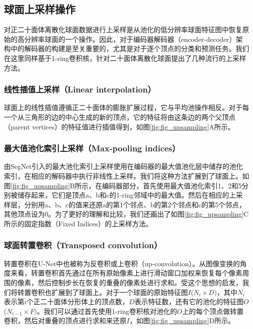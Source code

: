 \subsection{球面上采样操作}
对正二十面体离散化球面数据进行上采样是从池化的低分辨率球面特征图中恢复原始的高分辨率球面的一个操作。因此，对于编码器解码器（encoder-decoder）架构\cite{badrinarayanan2017segnet}中的解码器的构建是至关重要的，尤其是对于逐个顶点的分类和预测任务。我们在这里同样基于1-ring卷积核，针对二十面体离散化球面提出了几种流行的上采样方法。

\subsubsection{线性插值上采样（Linear interpolation）}
球面上的线性插值遵循正二十面体的膨胀扩展过程，它与平均池操作相反。对于每一个从三角形的边的中心生成的新的顶点，它的特征将由这条边的两个父顶点（parent vertices）的特征值进行插值得到，如图\ref{fig:fig_upsampling}A所示。

\subsubsection{最大值池化索引上采样（Max-pooling indices）}
由SegNet\cite{badrinarayanan2017segnet}引入的最大池化索引上采样使用在编码器的最大值池化层中储存的池化索引，在相应的解码器中执行非线性上采样。我们将这种方法扩展到了球面上。如图\ref{fig:fig_upsampling}B所示，在编码器部分，首先使用最大值池化索引1、2和5分别被储存起来，它们是顶点a、b和c的1-ring邻域中的最大值。然后在相应的上采样层，分别用a、b、c的值来还原a的第1个邻点、b的第2个邻点和c的第5个邻点，其他顶点设为0。为了更好的理解和比较，我们还画出了如图\ref{fig:fig_upsampling}C所示的固定指数（Fixed Indices）的上采样方法。

\subsubsection{球面转置卷积（Transposed convolution）}
转置卷积在U-Net中也被称为反卷积或上卷积（up-convolution）\cite{ronneberger2015u}。从图像变换的角度来看，转置卷积首先通过在所有原始像素上进行滑动窗口加权来恢复每个像素周围的像素，然后控制步长在恢复的重叠的像素处进行求和。受这个思想的启发，我们将转置卷积也扩展到了球面上。对于一个球面的原始特征图$I$($N_i\times D)$，其中$N_i$表示第$i$个正二十面体分形体上的顶点数，$D$表示特征数，还有它的池化的特征图$O$($N_{i-1}\times F)$。我们可以通过首先使用1-ring卷积核对池化的$O$上的每个顶点做转置卷积，然后对重叠的顶点进行求和来还原$I$，如图\ref{fig:fig_upsampling}D所示。

